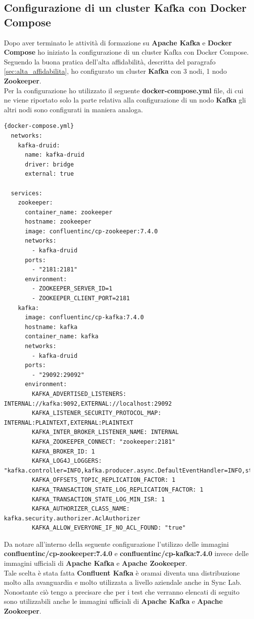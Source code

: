 \subsection{Configurazione di un cluster Kafka con Docker Compose}
Dopo aver terminato le attività di formazione su \textbf{Apache Kafka} e \textbf{Docker Compose} 
ho iniziato la configurazione di un cluster Kafka con Docker Compose. 
\\Seguendo la buona pratica dell'alta affidabilità, descritta del 
paragrafo \ref{sec:alta_affidabilita}, ho configurato un cluster \textbf{Kafka} con 3 nodi, 1 nodo \textbf{Zookeeper}.\\
Per la configurazione ho utilizzato il seguente \textbf{docker-compose.yml} file, di cui ne viene riportato solo la parte relativa alla configurazione di un nodo \textbf{Kafka} gli altri nodi sono configurati in maniera analoga.
\pagebreak
\begin{lstlisting}[caption=Configurazione cluster Kafka, label=lst:file]{docker-compose.yml}
  networks:
    kafka-druid:
      name: kafka-druid
      driver: bridge
      external: true
  
  services:
    zookeeper:
      container_name: zookeeper
      hostname: zookeeper
      image: confluentinc/cp-zookeeper:7.4.0
      networks: 
        - kafka-druid
      ports:
        - "2181:2181"
      environment:
        - ZOOKEEPER_SERVER_ID=1
        - ZOOKEEPER_CLIENT_PORT=2181
    kafka:
      image: confluentinc/cp-kafka:7.4.0
      hostname: kafka
      container_name: kafka
      networks:
        - kafka-druid
      ports:
        - "29092:29092"
      environment:
        KAFKA_ADVERTISED_LISTENERS: INTERNAL://kafka:9092,EXTERNAL://localhost:29092
        KAFKA_LISTENER_SECURITY_PROTOCOL_MAP: INTERNAL:PLAINTEXT,EXTERNAL:PLAINTEXT
        KAFKA_INTER_BROKER_LISTENER_NAME: INTERNAL
        KAFKA_ZOOKEEPER_CONNECT: "zookeeper:2181"
        KAFKA_BROKER_ID: 1
        KAFKA_LOG4J_LOGGERS: "kafka.controller=INFO,kafka.producer.async.DefaultEventHandler=INFO,state.change.logger=INFO"
        KAFKA_OFFSETS_TOPIC_REPLICATION_FACTOR: 1
        KAFKA_TRANSACTION_STATE_LOG_REPLICATION_FACTOR: 1
        KAFKA_TRANSACTION_STATE_LOG_MIN_ISR: 1
        KAFKA_AUTHORIZER_CLASS_NAME: kafka.security.authorizer.AclAuthorizer
        KAFKA_ALLOW_EVERYONE_IF_NO_ACL_FOUND: "true"  
\end{lstlisting}   
Da notare all'interno della seguente configurazione l'utilizzo delle immagini\\ \textbf{confluentinc/cp-zookeeper:7.4.0} e \textbf{confluentinc/cp-kafka:7.4.0} invece 
delle immagini ufficiali di \textbf{Apache Kafka} e \textbf{Apache Zookeeper}. \\
Tale scelta è stata fatta \textbf{Confluent Kafka} è oramai diventa una distribuzione molto alla avanguardia e molto utilizzata 
a livello aziendale anche in Sync Lab. \\
Nonostante ciò tengo a precisare che per i test che verranno elencati di seguito
sono utilizzabili anche le immagini ufficiali di \textbf{Apache Kafka} e \textbf{Apache Zookeeper}.
